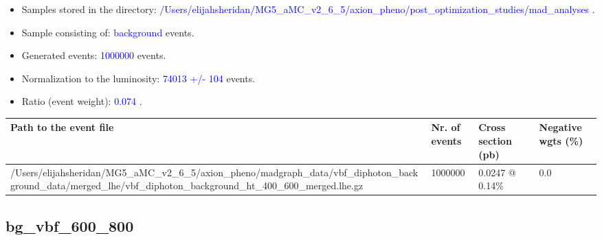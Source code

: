 \documentclass[a4paper, 10pt]{article}
\begin{document}
\begin{itemize}
  \item Samples stored in the directory: \textcolor{blue}{/\-Users/\-elijahsheridan/\-MG5\_aMC\_v2\_6\_5/\-axion\_pheno/\-post\_optimization\_studies/\-mad\_analyses} .
   \item Sample consisting of: \textcolor{blue}{background}  events.
   \item Generated events: \textcolor{blue}{1000000 }  events.
   \item Normalization to the luminosity: \textcolor{blue}{74013}\textcolor{blue}{ +/\-- }\textcolor{blue}{104 }  events.
   \item Ratio (event weight): \textcolor{blue}{0.074 } .  
 
\end{itemize}
\begin{table}[H]
  \begin{center}
    \begin{tabular}{|m{55.0mm}|m{25.0mm}|m{30.0mm}|m{30.0mm}|}
      \hline
      {\cellcolor{yellow}         Path to the event file}& {\cellcolor{yellow}         Nr. of events}& {\cellcolor{yellow}         Cross section (pb)}& {\cellcolor{yellow}         Negative wgts (\%)}\\
      \hline
      {\cellcolor{white}          /\-Users/\-elijahsheridan/\-MG5\_aMC\_v2\_6\_5/\-axion\_pheno/\-madgraph\_data/\-vbf\_diphoton\_background\_data/\-merged\_lhe/\-vbf\_diphoton\_background\_ht\_400\_600\_merged.lhe.gz}& {\cellcolor{white}          1000000}& {\cellcolor{white}          0.0247 @ 0.14\%}& {\cellcolor{white}          0.0}\\
\hline
    \end{tabular}
  \end{center}
\end{table}

\subsection{ bg\_vbf\_600\_800}
\end{document}
